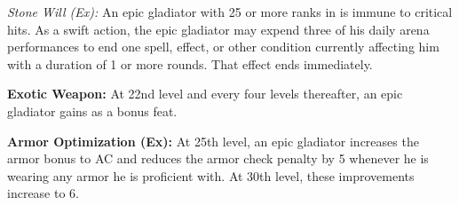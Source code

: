 \textit{Stone Will (Ex):} An epic gladiator with 25 or more ranks in  is immune to critical hits. As a swift action, the epic gladiator may expend three of his daily arena performances to end one spell, effect, or other condition currently affecting him with a duration of 1 or more rounds. That effect ends immediately.

\textbf{Exotic Weapon:} At 22nd level and every four levels thereafter, an epic gladiator gains  as a bonus feat.

\textbf{Armor Optimization (Ex):} At 25th level, an epic gladiator increases the armor bonus to AC and reduces the armor check penalty by 5 whenever he is wearing any armor he is proficient with. At 30th level, these improvements increase to 6.
